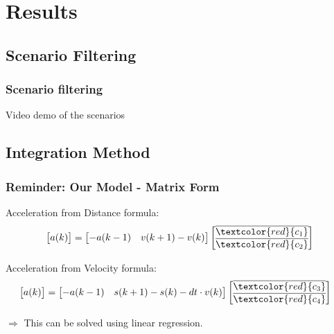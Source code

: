 
\section{Results}

\subsection{Scenario Filtering}

\begin{frame}
  \frametitle{Scenario filtering}
  \center Video demo of the scenarios
\end{frame}


\subsection{Integration Method}

\begin{frame}
  \frametitle{Reminder: Our Model - Matrix Form}
    Acceleration from Distance formula:
    \begin{align*}
        \begin{bmatrix} a(k) \\ \end{bmatrix}
        &=
        \begin{bmatrix}
            -a(k-1)  & v(k+1) - v(k)   \\ 
        \end{bmatrix}
        \begin{bmatrix}
            \overline{\textcolor{red}{c_1}} \\
            \overline{\textcolor{red}{c_2}} \\
        \end{bmatrix} \\
    \end{align*}

    Acceleration from Velocity formula:
    \begin{align*}
        \begin{bmatrix}
            a(k) \\ 
        \end{bmatrix}
        &=
        \begin{bmatrix}
            -a(k-1) &    s(k+1) - s(k) - dt \cdot  v(k)   \\ 
        \end{bmatrix}
        \begin{bmatrix}
            \overline{\textcolor{red}{c_3}} \\
            \overline{\textcolor{red}{c_4}} \\
        \end{bmatrix}
    \end{align*}

    \hfil

    $\Rightarrow$ This can be solved using linear regression.
\end{frame}

